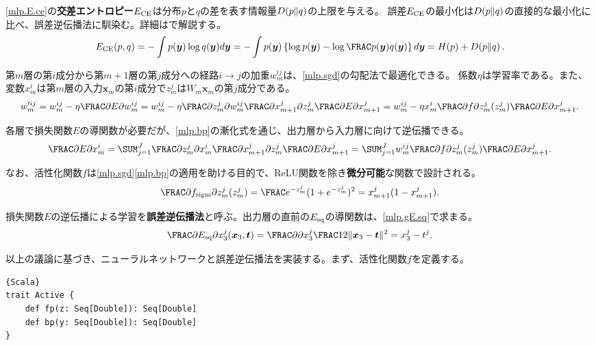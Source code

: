 \documentclass[10pt,a4paper]{book}
\begin{document}
\eqref{mlp.E.ce}の\textbf{交差エントロピー}$E_\mathrm{CE}$は分布$p$と$q$の差を表す\nKL 情報量$D\!\left(p\|q\right)$の上限を与える。
誤差$E_\mathrm{CE}$の最小化は$D\!\left(p\|q\right)$の直接的な最小化に比べ、誤差逆伝播法に馴染む。詳細はで解説する。
%
\begin{equation}
\label{eq:mlp.E.ce}
\Ece(p,q)
= -\int p(\bm{y}) \log q(\bm{y}) d\bm{y}
= -\int p(\bm{y}) \left\{\log p(\bm{y}) - \log\frac{p(\bm{y})}{q(\bm{y})}\right\} d\bm{y}
= H(p) + \KL{p}{q}.
\end{equation}

第$m$層の第$i$成分から第$m\!+\!1$層の第$j$成分への経路$i\!\to\!j$の加重$w_m^{ij}$は、\eqref{mlp.sgd}の勾配法で最適化できる。
係数$\eta$は学習率である。また、変数$x_m^i$は第$m$層の入力$\bm{x}_m$の第$i$成分で$z_m^j$は$W_m\bm{x}_m$の第$j$成分である。
%
\begin{equation}
\label{eq:mlp.sgd}
w_m'^{ij}
= w_m^{ij}-\eta \pdiff{E}{w_m^{ij}}
= w_m^{ij}-\eta \pdiff{z_m^j}{w_m^{ij}} \pdiff{x_{m+1}^j}{z_m^j} \pdiff{E}{x_{m+1}^j}
= w_m^{ij}-\eta x_m^i \pdiff{f}{z_m^j}(z_m^j) \pdiff{E}{x_{m+1}^j}.
\end{equation}

各層で損失関数$E$の導関数が必要だが、\eqref{mlp.bp}の漸化式を通じ、出力層から入力層に向けて逆伝播できる。
%
\begin{equation}
\label{eq:mlp.bp}
\pdiff{E}{x_m^i}
= \sum_{j=1}^J \pdiff{z_m^j}{x_m^i} \pdiff{x_{m+1}^j}{z_m^j} \pdiff{E}{x_{m+1}^j}
= \sum_{j=1}^J w_m^{ij} \pdiff{f}{z_m^j}(z_m^j) \pdiff{E}{x_{m+1}^j}.
\end{equation}

なお、活性化関数$f$は\eqref{mlp.sgd}\eqref{mlp.bp}の適用を助ける目的で、ReLU関数を除き\textbf{微分可能}な関数で設計される。
%
\begin{equation}
\label{eq:nn.sigm.d}
\pdiff{\sigm}{z_m^j}(z_m^j) = \frac{e^{-z_m^j}}{(1+e^{-z_m^j})^2} = x_{m+1}^j(1-x_{m+1}^j).
\end{equation}

損失関数$E$の逆伝播による学習を\textbf{誤差逆伝播法}と呼ぶ。出力層の直前の$E_\mathrm{sq}$の導関数は、\eqref{mlp.gE.sq}で求まる。
%
\begin{equation}
\label{eq:mlp.gE.sq}
\pdiff{\Esq}{x_3^j}(\bm{x}_3,\bm{t}) = \pdiff{}{x_3^j} \frac{1}{2} \|\bm{x}_3-\bm{t}\|^2 = x_3^j - t^j.
\end{equation}

以上の議論に基づき、ニューラルネットワークと誤差逆伝播法を実装する。まず、活性化関数$f$を定義する。

\begin{Verbatim}{Scala}
trait Active {
	def fp(z: Seq[Double]): Seq[Double]
	def bp(y: Seq[Double]): Seq[Double]
}
\end{Verbatim}
\end{document}
